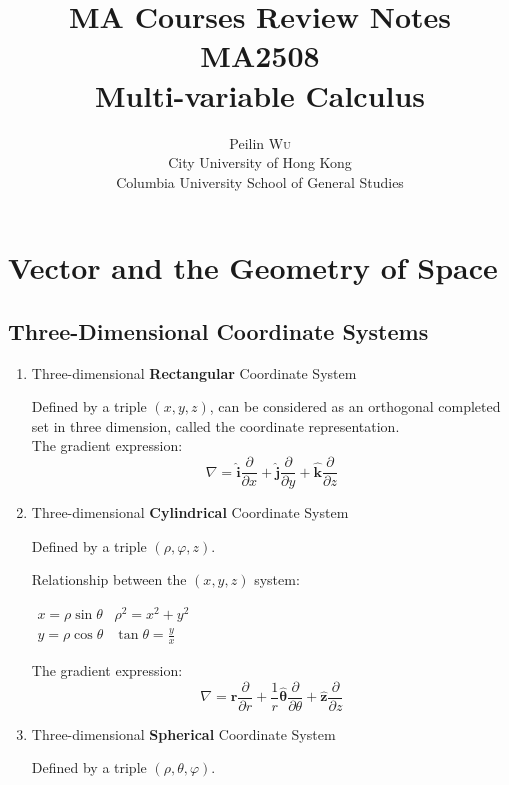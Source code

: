 \documentclass[UTF8,a4paper, 10pt, openany]{svmono}
\title{MA Courses Review Notes\\MA2508\\Multi-variable Calculus}
\author{Peilin \textsc{Wu}\\ City University of Hong Kong\\Columbia University School of General Studies}
\begin{document}
\maketitle
\tableofcontents

\chapter{Vector and the Geometry of Space}
\section{Three-Dimensional Coordinate Systems}
\begin{enumerate}
\item Three-dimensional \textbf{Rectangular} Coordinate System

Defined by a triple $(x, y, z)$, can be considered as an orthogonal completed set in three dimension, called the coordinate representation. \\

The gradient expression:
\begin{equation}
 \boxed{\nabla = \mathbf{\hat{i}}\dfrac{\partial }{\partial x}+\mathbf{\hat{j}}\dfrac{\partial }{\partial y}+\mathbf{\hat{k}}\dfrac{\partial }{\partial z}}
\end{equation}

\item Three-dimensional \textbf{Cylindrical} Coordinate System

Defined by a triple $(\rho, \varphi, z)$.

Relationship between the $(x, y, z)$ system:
\begin{center}
$\begin{array}{cc}
x = \rho \sin \theta  &  \rho ^2 = x^2+y^2\\
y = \rho \cos \theta  &  \tan \theta = \frac{y}{x}
\end{array}$
\end{center}

The gradient expression:
\begin{equation}
 \boxed{\nabla = \mathbf{\hat{r}}\dfrac{\partial }{\partial r}+\dfrac{1}{r}\mathbf{\hat{\theta}}\dfrac{\partial }{\partial \theta}+\mathbf{\hat{z}}\dfrac{\partial }{\partial z}}
\end{equation}

\item Three-dimensional \textbf{Spherical} Coordinate System

Defined by a triple $(\rho, \theta, \varphi)$.


\end{enumerate}
\end{document}
